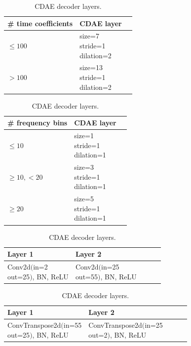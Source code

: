 \documentclass[report.tex]{subfiles}
\begin{document}
\begin{table}[ht]
	\centering
	\caption{Kernel parameters, time dimension.}
	\label{table:convtable1}
	\begin{tabular}{ |l|l|l| }
	 \hline
		\# time coefficients & CDAE layer \\
	 \hline
	 \hline
		$\le 100$ & \makecell[l]{size=7\\stride=1\\dilation=2} \\
	 \hline
		$> 100$ & \makecell[l]{size=13\\stride=1\\dilation=2} \\
	 \hline
\end{tabular}
	\vspace{1em}
	\caption{Kernel parameters, frequency dimension.}
	\label{table:convtable2}
\begin{tabular}{ |l|l|l| }
	 \hline
		\# frequency bins & CDAE layer \\
	 \hline
	 \hline
		$\le 10$ & \makecell[l]{size=1\\stride=1\\dilation=1} \\
	 \hline
		$\ge 10, < 20$ & \makecell[l]{size=3\\stride=1\\dilation=1} \\
	 \hline
		$\ge 20$ & \makecell[l]{size=5\\stride=1\\dilation=1} \\
	 \hline
\end{tabular}
	\vspace{1em}
	\caption{CDAE encoder layers.}
	\label{table:convtable3}
\begin{tabular}{ |l|l|l|l|l| }
	 \hline
		Layer 1 & Layer 2 \\
	 \hline
	 \hline
		Conv2d$\Big($\makecell[l]{in=2\\out=25}$\Big)$, BN, ReLU & Conv2d$\Big($\makecell[l]{in=25\\out=55}$\Big)$, BN, ReLU \\
	 \hline
\end{tabular}
	\vspace{1em}
	\caption{CDAE decoder layers.}
	\label{table:convtable4}
\begin{tabular}{ |l|l|l|l|l| }
	 \hline
		Layer 1 & Layer 2 \\
	 \hline
	 \hline
		ConvTranspose2d$\Big($\makecell[l]{in=55\\out=25}$\Big)$, BN, ReLU & ConvTranspose2d$\Big($\makecell[l]{in=25\\out=2}$\Big)$, BN, ReLU \\
	 \hline
\end{tabular}
\end{table}
\end{document}
